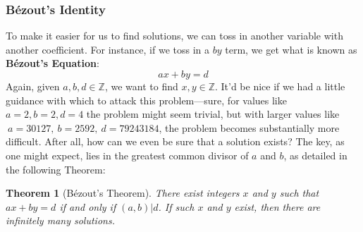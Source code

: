 \documentclass[10pt]{article}
\newcommand\ZZ{{\mathbb Z}}
\newtheorem{theorem}{Theorem}[section]
\theoremstyle{definition}
\begin{document}
\subsubsection{B\'{e}zout's Identity}
To make it easier for us to find solutions, we can toss in another variable with another coefficient.  For instance, if we toss in a $by$ term, we get what is known as \textbf{B\'{e}zout's Equation}:
\begin{equation}\label{eq:Bezout's}
ax+by=d
\end{equation}
Again, given $a,b,d\in\ZZ$, we want to find $x,y\in\ZZ$.  It'd be nice if we had a little guidance with which to attack this problem---sure, for values like $a=2,b=2,d=4$ the problem might seem trivial, but with larger values like $~a=30127,~b=2592,~d=79243184$, the problem becomes substantially more difficult.  After all, how can we even be sure that a solution exists?  The key, as one might expect, lies in the greatest common divisor of $a$ and $b$, as detailed in the following Theorem:
\begin{theorem}[B\'{e}zout's Theorem]
There exist integers $x$ and $y$ such that 
$ax+by=d$ if and only if $(a,b)|d$.  If such $x$ and $y$ exist, then there are infinitely many solutions. 
\end{theorem}
\end{document}
